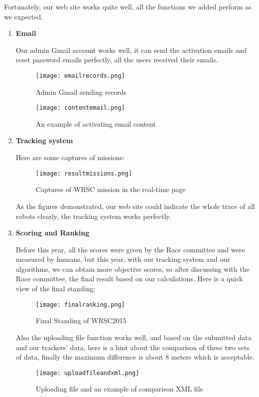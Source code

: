 Fortunately, our web site works quite well, all the functions we added perform as we expected. 
\begin{enumerate}
\item{\textbf{Email}}

Our admin Gmail account works well, it can send the activation emails and reset password emails perfectly, all the users received their emails.
\begin{figure}[h!]
\centering
\texttt{[image: emailrecords.png]}
\caption{Admin Gmail sending records}
\label{fig-sample}
\end{figure}

\begin{figure}[h!]
\centering
\texttt{[image: contentemail.png]}
\caption{An example of activating email content}
\label{fig-sample}
\end{figure}

\item{\textbf{Tracking system}}


Here are some captures of missions:
\begin{figure}[h!]
\centering
\texttt{[image: resultmissions.png]}
\caption{Captures of WRSC mission in the real-time page }
\label{fig-sample}
\end{figure}
As the figures demonstrated, our web site could indicate the whole trace of all robots clearly, the tracking system works perfectly.

\item{\textbf{Scoring and Ranking}}

Before this year, all the scores were given by the Race committee and were measured by humans, but this year, with our tracking system and our algorithms, we can obtain more objective scores, so after discussing with the Race committee, the final result based on our calculations. Here is a quick view of the final standing:
\begin{figure}[h!]
\centering
\texttt{[image: finalranking.png]}
\caption{Final Standing of WRSC2015 }
\label{fig-sample}
\end{figure}
Also the uploading file function works well, and based on the submitted data and our trackers' data, here is a hint about the comparison of these two sets of data, finally the maximum difference is about 8 meters which is acceptable.
\begin{figure}[h!]
\centering
\texttt{[image: uploadfileandxml.png]}
\caption{Uploading file and an example of comparison XML file}
\label{fig-sample}
\end{figure}

\end{enumerate}
